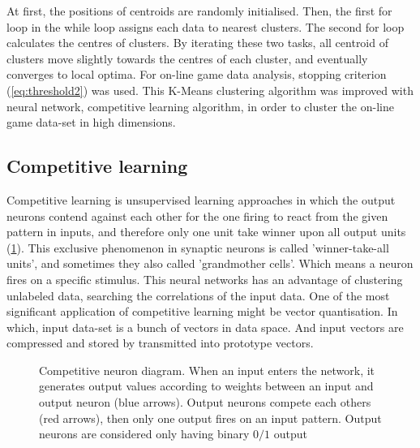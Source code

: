 \documentclass[12pt,a4paper]{report}
\begin{document}
At first, the positions of centroids are randomly initialised. Then, the first for loop in the while loop assigns each data to nearest clusters. The second for loop calculates the centres of clusters. By iterating these two tasks, all centroid of clusters move slightly towards the centres of each cluster, and eventually converges to local optima. For on-line game data analysis, stopping criterion (\ref{eq:threshold2}) was used. This K-Means clustering algorithm was improved with neural network, competitive learning algorithm, in order to cluster the on-line game data-set in high dimensions.

\subsection{Competitive learning}

Competitive learning is unsupervised learning approaches in which the output neurons contend against each other for the one firing to react from the given pattern in inputs, and therefore only one unit take winner upon all output units (\ref{fig:Competitive_Diagram}). This exclusive phenomenon in synaptic neurons is called 'winner-take-all units', and sometimes they also called 'grandmother cells'. Which means a neuron fires on a specific stimulus. This neural networks has an advantage of clustering unlabeled data, searching the correlations of the input data. One of the most significant application of competitive learning might be vector quantisation. In which, input data-set is a bunch of vectors in data space. And input vectors are compressed and stored by transmitted into prototype vectors.

\begin{figure}[thpb] \label{fig:Competitive_Diagram}
	\begin{center}
	\end{center}
	\caption{Competitive neuron diagram. When an input enters the network, it generates output values according to weights between an input and output neuron (blue arrows). Output neurons compete each others (red arrows), then only one output fires on an input pattern. Output neurons are considered only having binary $0/1$ output}
\end{figure}
\end{document}
